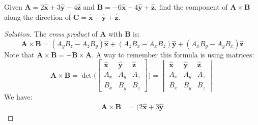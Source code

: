 \documentclass[crop=false,class=article,oneside]{standalone}
\begin{document}
        \begin{problem}[Wangsness 1-5]
            Given 
            $\mathbf{A}=2\hat{\mathbf{x}}%
             +3\hat{\mathbf{y}}-4\hat{\mathbf{z}}$
            and
            $\mathbf{B}%
             =-6\hat{\mathbf{x}}-4\hat{\mathbf{y}}%
             +\hat{\mathbf{z}}$,
            find the component of
            $\mathbf{A}\times\mathbf{B}$
            along the direction of
            $\mathbf{C}%
             =\hat{\mathbf{x}}-\hat{\mathbf{y}}%
             +\hat{\mathbf{z}}$.
        \end{problem}
        \begin{proof}[Solution]
            The \textit{cross product} of $\mathbf{A}$
            with $\mathbf{B}$ is:
            \begin{equation*}
                \mathbf{A}\times\mathbf{B}
                =(A_{y}B_{z}-A_{z}B_{y})\hat{\mathbf{x}}
                +(A_{z}B_{x}-A_{x}B_{z})\hat{\mathbf{y}}
                +(A_{x}B_{y}-A_{y}B_{x})\hat{\mathbf{z}}
            \end{equation*}
            Note that
            $\mathbf{A}\times\mathbf{B}%
             =-\mathbf{B}\times\mathbf{A}$.
            A way to remember this formula is using matrices:
            \begin{equation*}
                \mathbf{A}\times\mathbf{B}
                =\det\Bigg(
                    \begin{bmatrix}
                        \hat{\mathbf{x}}
                        &\hat{\mathbf{y}}
                        &\hat{\mathbf{z}}\\
                        A_{x}&A_{y}&A_{z}\\
                        B_{x}&B_{y}&B_{z}
                    \end{bmatrix}
                \Bigg)
                =
                \begin{vmatrix}
                    \hat{\mathbf{x}}
                    &\hat{\mathbf{y}}
                    &\hat{\mathbf{z}}\\
                    A_{x}&A_{y}&A_{z}\\
                    B_{x}&B_{y}&B_{z}
                \end{vmatrix}
            \end{equation*}
            We have:
            \begin{align*}
                \mathbf{A}\times\mathbf{B}
                &=
                (2\hat{\mathbf{x}}
                +3\hat{\mathbf{y}}

\end{align*}
\end{proof}
\end{document}
